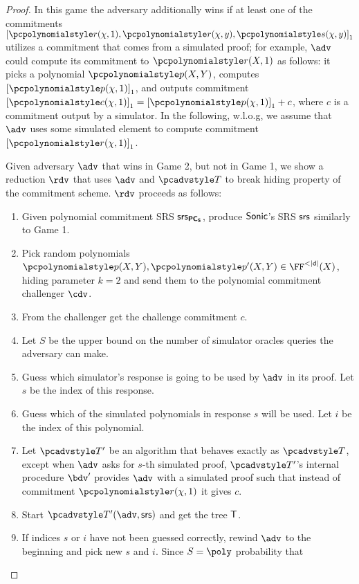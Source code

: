 \documentclass[runningheads,11pt]{llncs}
\begin{document}
\begin{proof}
   In this game the adversary additionally wins if at least one of
  the commitments $\gone{\p{r} (\chi, 1), \p{r} (\chi, y), \p{s} (\chi, y)}$
  utilizes a commitment that comes from a simulated proof; for example, $\adv$
  could compute its commitment to $\p{r} (X, 1)$ as follows: it picks a
  polynomial $\p{p} (X, Y)$, computes $\gone{\p{p} (\chi, 1)}$, and outputs
  commitment $\gone{\p{c} (\chi, 1)} = \gone{\p{p} (\chi, 1)} + c$, where $c$ is
  a commitment output by a simulator. In the following, w.l.o.g, we assume that
  $\adv$ uses some simulated element to compute commitment
  $\gone{\p{r} (\chi, 1)}$.

   Given adversary $\adv$ that wins in Game 2, but not
  in Game 1, we show a reduction $\rdv$ that uses $\adv$ and $\tdv$ to break
  hiding property of the commitment scheme. $\rdv$ proceeds as follows:
  \begin{enumerate}
  \item Given polynomial commitment SRS $\mathsf{srs}_{\bm{\mathsf{PC}}_{\bm{\mathsf{S}}}}$, produce ${\textnormal{\textsf{Sonic}}}$'s SRS
    $\mathsf{srs}$ similarly to Game 1. 
  \item Pick random polynomials
    $\p{p} (X, Y), \p{p'} (X, Y) \in \FF^{< |\dconst|} (X)$, hiding parameter
    $k = 2$ and send them to the polynomial commitment challenger $\cdv$.
  \item From the challenger get the challenge commitment $c$.
  \item Let $S$ be the upper bound on the number of simulator oracles queries
    the adversary can make. 
  \item Guess which simulator's response is going to be used by $\adv$ in its
    proof. Let $s$ be the index of this response.
  \item Guess which of the simulated polynomials in response $s$ will be
    used. Let $i$ be the index of this polynomial.
  \item Let $\tdv'$ be an algorithm that behaves exactly as $\tdv$, except when
    $\adv$ asks for $s$-th simulated proof, $\tdv'$'s internal procedure $\bdv'$
    provides $\adv$ with a simulated proof such that instead of commitment
    $\p{r} (\chi, 1)$ it gives $c$. 
  \item Start $\tdv'(\adv, \srs)$ and get the tree $\mathsf{T}$.
  \item If indices $s$ or $i$ have not been guessed correctly, rewind $\adv$ to
    the beginning and pick new $s$ and $i$. Since $S = \poly$ probability that

\end{enumerate}
\end{proof}
\end{document}
